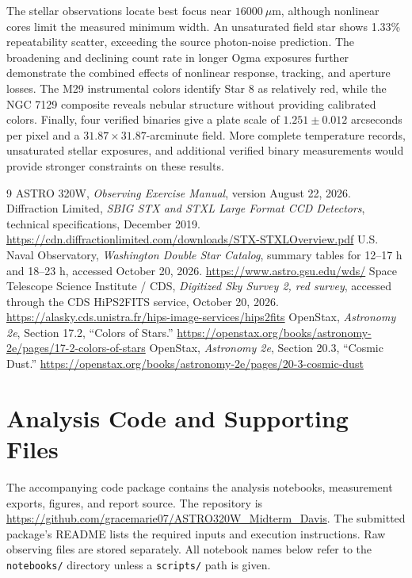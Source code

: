 \documentclass[12pt,letterpaper,twocolumn]{article}
\begin{document}
The stellar observations locate best focus near $16000~\mu\mathrm{m}$,
although nonlinear cores limit the measured minimum width. An
unsaturated field star shows 1.33\% repeatability scatter, exceeding
the source photon-noise prediction. The broadening and declining count
rate in longer Ogma exposures further demonstrate the combined effects
of nonlinear response, tracking, and aperture losses. The M29
instrumental colors identify Star 8 as relatively red, while the NGC
7129 composite reveals nebular structure without providing calibrated
colors. Finally, four verified binaries give a plate scale of
$1.251\pm0.012$ arcseconds per pixel and a
$31.87\times31.87$-arcminute field. More complete temperature records,
unsaturated stellar exposures, and additional verified binary
measurements would provide stronger constraints on these results.
\begin{thebibliography}{9}\small
{}
ASTRO 320W, \textit{Observing Exercise Manual}, version August 22, 2026.
Diffraction Limited, \textit{SBIG STX and STXL Large Format CCD Detectors},
technical specifications, December 2019.
\url{https://cdn.diffractionlimited.com/downloads/STX-STXLOverview.pdf}
U.S. Naval Observatory, \textit{Washington Double Star Catalog},
summary tables for 12--17 h and 18--23 h, accessed October 20, 2026.
\url{https://www.astro.gsu.edu/wds/}
Space Telescope Science Institute / CDS, \textit{Digitized Sky Survey 2,
red survey}, accessed through the CDS HiPS2FITS service,
October 20, 2026.
\url{https://alasky.cds.unistra.fr/hips-image-services/hips2fits}
OpenStax, \textit{Astronomy 2e}, Section 17.2, ``Colors of Stars.''
\url{https://openstax.org/books/astronomy-2e/pages/17-2-colors-of-stars}
OpenStax, \textit{Astronomy 2e}, Section 20.3, ``Cosmic Dust.''
\url{https://openstax.org/books/astronomy-2e/pages/20-3-cosmic-dust}
\end{thebibliography}
\clearpage\onecolumn\appendix
{}
\section{Analysis Code and Supporting Files}
The accompanying code package contains the analysis notebooks, measurement
exports, figures, and report source. The repository is
\url{https://github.com/gracemarie07/ASTRO320W_Midterm_Davis}.
The submitted package's README lists the required inputs and execution
instructions. Raw observing files are stored separately. All notebook
names below refer to the \nolinkurl{notebooks/} directory unless a
\nolinkurl{scripts/} path is given.
\end{document}
